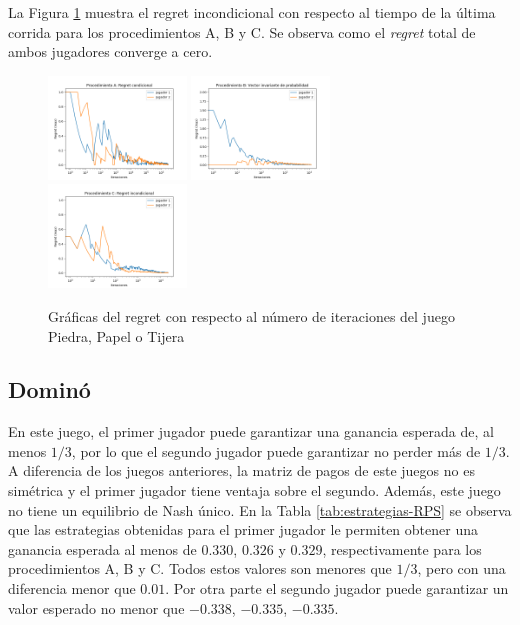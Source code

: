 La Figura \ref{fig:regret-RPS} muestra el regret incondicional con respecto al tiempo de la última corrida para los procedimientos A, B y C. Se observa como el \textit{regret} total de ambos jugadores converge a cero.

\begin{figure}[ht]
\caption{Gráficas del regret con respecto al número de iteraciones del juego Piedra, Papel o Tijera}
\label{fig:regret-RPS}
\centering
\includegraphics[width=0.327\textwidth]{graficas/RPS/procedimiento-A.png}
\includegraphics[width=0.327\textwidth]{graficas/RPS/procedimiento-B.png}
\includegraphics[width=0.327\textwidth]{graficas/RPS/procedimiento-C.png}
\end{figure}

\subsection{Dominó}

En este juego, el primer jugador puede garantizar una ganancia esperada de, al menos $1/3$, por lo que el segundo jugador puede garantizar no perder más de $1/3$. A diferencia de los juegos anteriores, la matriz de pagos de este juegos no es simétrica y el primer jugador tiene ventaja sobre el segundo. Además, este juego no tiene un equilibrio de Nash único. En la Tabla \ref{tab:estrategias-RPS} se observa que las estrategias obtenidas para el primer jugador le permiten obtener una ganancia esperada al menos de $0.330$, $0.326$ y $0.329$, respectivamente para los procedimientos A, B y C. Todos estos valores son menores que $1/3$, pero con una diferencia menor que $0.01$. Por otra parte el segundo jugador puede garantizar un valor esperado no menor que $-0.338$, $-0.335$, $-0.335$.

